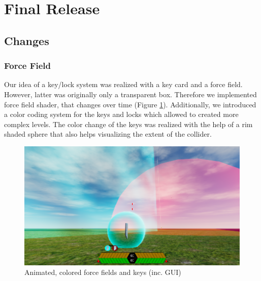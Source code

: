 \documentclass[12pt, letterpaper]{scrartcl}
\begin{document}
	 \newpage
	 \section{Final Release}
	 \subsection{Changes}
	 \subsubsection{Force Field}
	 Our idea of a key/lock system was realized with a key card and a force field. However, latter was originally only a transparent box. Therefore we implemented force field shader, that changes over time (Figure \ref{fig:forceField}). Additionally, we introduced a color coding system for the keys and locks which allowed to created more complex levels. The color change of the keys was realized with the help of a rim shaded sphere that also helps visualizing the extent of the collider.
	 \begin{figure}[H]
	 	\centering
	 	\includegraphics[width=\textwidth]{images/final/ForceField}
	 	\caption{Animated, colored force fields and keys (inc. GUI)}
	 	\label{fig:forceField}
	 \end{figure}
	 
\end{document}
